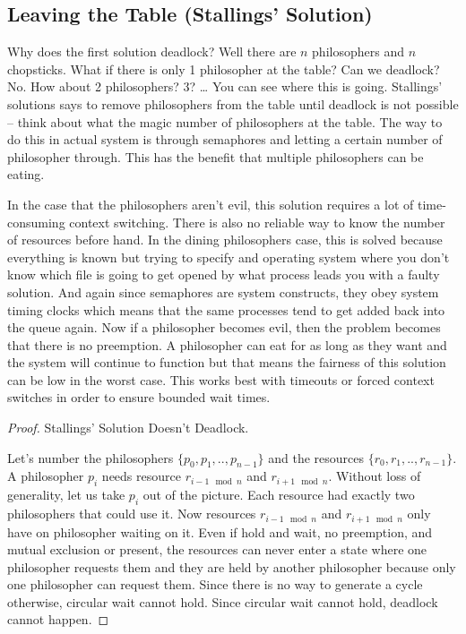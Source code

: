 \subsection{Leaving the Table (Stallings' Solution)}

Why does the first solution deadlock? Well there are $n$ philosophers and $n$ chopsticks.
What if there is only 1 philosopher at the table? Can we deadlock? No.
How about 2 philosophers? 3? \ldots{} You can see where this is going.
Stallings' \cite[P. 280]{stalling} solutions says to remove philosophers from the table until deadlock is not possible -- think about what the magic number of philosophers at the table.
The way to do this in actual system is through semaphores and letting a certain number of philosopher through.
This has the benefit that multiple philosophers can be eating.

In the case that the philosophers aren't evil, this solution requires a lot of time-consuming context switching.
There is also no reliable way to know the number of resources before hand.
In the dining philosophers case, this is solved because everything is known but trying to specify and operating system where you don't know which file is going to get opened by what process leads you with a faulty solution.
And again since semaphores are system constructs, they obey system timing clocks which means that the same processes tend to get added back into the queue again.
Now if a philosopher becomes evil, then the problem becomes that there is no preemption.
A philosopher can eat for as long as they want and the system will continue to function but that means the fairness of this solution can be low in the worst case.
This works best with timeouts or forced context switches in order to ensure bounded wait times.

\begin{proof} Stallings' Solution Doesn't Deadlock.

Let's number the philosophers $\{p_0, p_1, .., p_{n-1}\}$ and the resources $\{r_0, r_1, .., r_{n-1}\}$. A philosopher $p_i$ needs resource $r_{i-1 \mod n}$ and $r_{i + 1 \mod n}$. Without loss of generality, let us take $p_i$ out of the picture. Each resource had exactly two philosophers that could use it. Now resources $r_{i-1 \mod n}$ and $r_{i + 1 \mod n}$ only have on philosopher waiting on it. Even if hold and wait, no preemption, and mutual exclusion or present, the resources can never enter a state where one philosopher requests them and they are held by another philosopher because only one philosopher can request them. Since there is no way to generate a cycle otherwise, circular wait cannot hold. Since circular wait cannot hold, deadlock cannot happen.

\end{proof}


